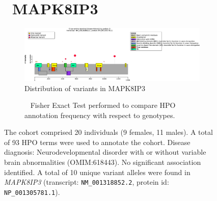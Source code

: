 \begin{figure}[htbp]
\section*{ MAPK8IP3}
\centering
\begin{subfigure}[b]{0.95\textwidth}
\centering
\includegraphics[width=\textwidth]{ img/MAPK8IP3_protein_diagram.pdf} 
\captionsetup{justification=raggedright,singlelinecheck=false}
\caption{Distribution of variants in MAPK8IP3}
\end{subfigure}

\vspace{2em}

\begin{subfigure}[b]{0.95\textwidth}
\centering
{}
\captionsetup{justification=raggedright,singlelinecheck=false}
\caption{             Fisher Exact Test performed to compare HPO annotation frequency with respect to genotypes. }
\end{subfigure}

\vspace{2em}

\caption{ The cohort comprised 20 individuals (9 females, 11 males). A total of 93 HPO terms were used to annotate the cohort. Disease diagnosis: Neurodevelopmental disorder with or without variable brain abnormalities (OMIM:618443). No significant association identified. A total of 10 unique variant alleles were found in \textit{MAPK8IP3} (transcript: \texttt{NM\_001318852.2}, protein id: \texttt{NP\_001305781.1}).}
\end{figure}
